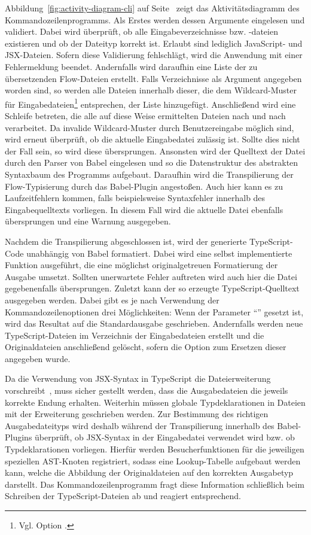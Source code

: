 Abbildung~\ref{fig:activity-diagram-cli} auf Seite~\pageref{fig:activity-diagram-cli} zeigt das Aktivitätsdiagramm des Kommandozeilenprogramms. Als Erstes werden dessen Argumente eingelesen und validiert. Dabei wird überprüft, ob alle Eingabeverzeichnisse bzw. -dateien existieren und ob der Dateityp korrekt ist. Erlaubt sind lediglich JavaScript- und JSX-Dateien. Sofern diese Validierung fehlschlägt, wird die Anwendung mit einer Fehlermeldung beendet. Andernfalls wird daraufhin eine Liste der zu übersetzenden Flow-Dateien erstellt. Falls Verzeichnisse als Argument angegeben worden sind, so werden alle Dateien innerhalb dieser, die dem Wildcard-Muster für Eingabedateien\footnote{Vgl. Option .} entsprechen, der Liste hinzugefügt. Anschließend wird eine Schleife betreten, die alle auf diese Weise ermittelten Dateien nach und nach verarbeitet. Da invalide Wildcard-Muster durch Benutzereingabe möglich sind, wird erneut überprüft, ob die aktuelle Eingabedatei zulässig ist. Sollte dies nicht der Fall sein, so wird diese übersprungen. Ansonsten wird der Quelltext der Datei durch den Parser von Babel eingelesen und so die Datenstruktur des abstrakten Syntaxbaum des Programms aufgebaut. Daraufhin wird die Transpilierung der Flow-Typisierung durch das Babel-Plugin angestoßen. Auch hier kann es zu Laufzeitfehlern kommen, falls beispielsweise Syntaxfehler innerhalb des Eingabequelltexts vorliegen. In diesem Fall wird die aktuelle Datei ebenfalls übersprungen und eine Warnung ausgegeben.

Nachdem die Transpilierung abgeschlossen ist, wird der generierte TypeScript-Code unabhängig von Babel formatiert. Dabei wird eine selbst implementierte Funktion ausgeführt, die eine möglichst originalgetreuen Formatierung der Ausgabe umsetzt. Sollten unerwartete Fehler auftreten wird auch hier die Datei gegebenenfalls übersprungen. Zuletzt kann der so erzeugte TypeScript-Quelltext ausgegeben werden. Dabei gibt es je nach Verwendung der Kommandozeilenoptionen drei Möglichkeiten: Wenn der Parameter \enquote{} gesetzt ist, wird das Resultat auf die Standardausgabe geschrieben. Andernfalls werden neue TypeScript-Dateien im Verzeichnis der Eingabedateien erstellt und die Originaldateien anschließend gelöscht, sofern die Option zum Ersetzen dieser angegeben wurde.

Da die Verwendung von JSX-Syntax in TypeScript die Dateierweiterung  vorschreibt~\autocite{TS:HANDBOOK:JSX}, muss sicher gestellt werden, dass die Ausgabedateien die jeweils korrekte Endung erhalten. Weiterhin müssen globale Typdeklarationen in Dateien mit der Erweiterung  geschrieben werden. Zur Bestimmung des richtigen Ausgabedateityps wird deshalb während der Transpilierung innerhalb des Babel-Plugins überprüft, ob JSX-Syntax in der Eingabedatei verwendet wird bzw. ob Typdeklarationen vorliegen. Hierfür werden Besucherfunktionen für die jeweiligen speziellen AST-Knoten registriert, sodass eine Lookup-Tabelle aufgebaut werden kann, welche die Abbildung der Originaldateien auf den korrekten Ausgabetyp darstellt. Das Kommandozeilenprogramm fragt diese Information schließlich beim Schreiben der TypeScript-Dateien ab und reagiert entsprechend.

